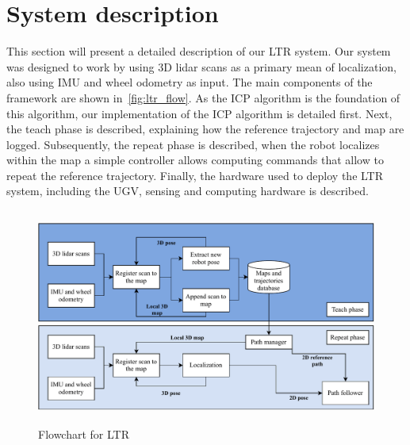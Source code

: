 \section{System description}
\label{sec:sys}

This section will present a detailed description of our \ac{LTR} system.
Our system was designed to work by using 3D lidar scans as a primary mean of localization, also using \ac{IMU} and wheel odometry as input.
The main components of the framework are shown in~\autoref{fig:ltr_flow}.
As the \ac{ICP} algorithm is the foundation of this algorithm, our implementation of the \ac{ICP} algorithm is detailed first.
Next, the teach phase is described, explaining how the reference trajectory and map are logged.
Subsequently, the repeat phase is described, when the robot localizes within the map a simple controller allows computing commands that allow to repeat the reference trajectory.
Finally, the hardware used to deploy the \ac{LTR} system, including the \ac{UGV}, sensing and computing hardware is described.

\begin{figure} [h!]
	\centering
	\includegraphics[height=2.8in]{figs/LTR_flowchart.pdf}
	\caption{Flowchart for LTR}
	\label{fig:ltr_flow}
\end{figure}


